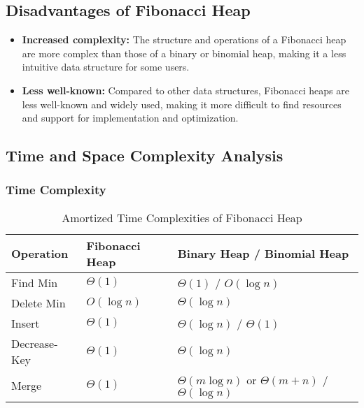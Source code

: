 \documentclass[a4paper,10pt]{article}
\begin{document}
\subsection*{Disadvantages of Fibonacci Heap}

\begin{itemize}
    \item \textbf{Increased complexity:} The structure and operations of a Fibonacci heap are more complex than those of a binary or binomial heap, making it a less intuitive data structure for some users.
    \item \textbf{Less well-known:} Compared to other data structures, Fibonacci heaps are less well-known and widely used, making it more difficult to find resources and support for implementation and optimization.
\end{itemize}



\subsection{Time and Space Complexity Analysis}

\subsubsection*{Time Complexity}
\begin{table}[H]
    \raggedright
    \begin{tabular}{|l|l|l|}
    \hline
    \textbf{Operation} & \textbf{Fibonacci Heap} & \textbf{Binary Heap / Binomial Heap} \\ \hline
    Find Min          & $\Theta(1)$             & $\Theta(1)$ / $O(\log n)$            \\ \hline
    Delete Min        & $O(\log n)$             & $\Theta(\log n)$                     \\ \hline
    Insert            & $\Theta(1)$             & $\Theta(\log n)$ / $\Theta(1)$       \\ \hline
    Decrease-Key      & $\Theta(1)$             & $\Theta(\log n)$                     \\ \hline
    Merge             & $\Theta(1)$             & $\Theta(m \log n)$ or $\Theta(m+n)$ / $\Theta(\log n)$ \\ \hline
    \end{tabular}
    \caption{Amortized Time Complexities of Fibonacci Heap}
\end{table}
    
\end{document}
